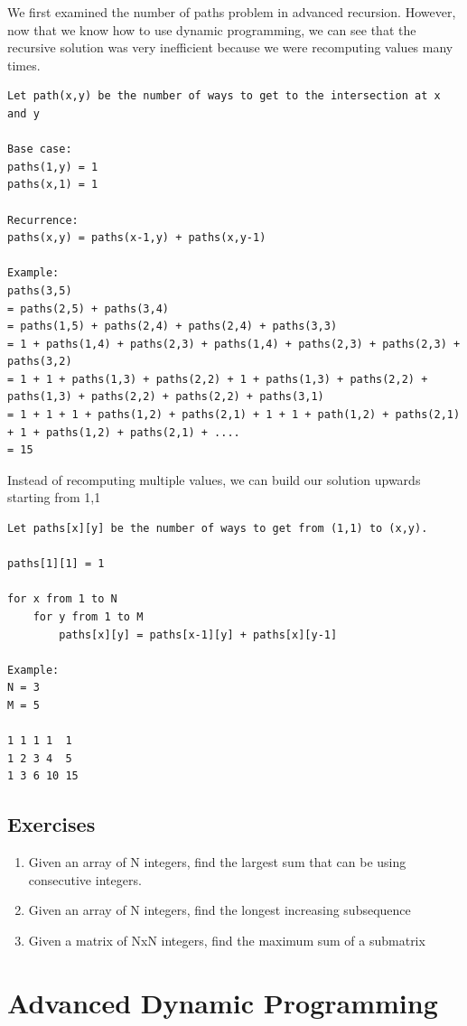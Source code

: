 \documentclass[11pt,oneside]{book}
\begin{document}
We first examined the number of paths problem in advanced recursion. However, now that we know how to use dynamic programming, we can see that the recursive solution was very inefficient because we were recomputing values many times.

\begin{lstlisting}
Let path(x,y) be the number of ways to get to the intersection at x and y

Base case:
paths(1,y) = 1
paths(x,1) = 1

Recurrence:
paths(x,y) = paths(x-1,y) + paths(x,y-1)

Example:
paths(3,5)
= paths(2,5) + paths(3,4)
= paths(1,5) + paths(2,4) + paths(2,4) + paths(3,3)
= 1 + paths(1,4) + paths(2,3) + paths(1,4) + paths(2,3) + paths(2,3) + paths(3,2)
= 1 + 1 + paths(1,3) + paths(2,2) + 1 + paths(1,3) + paths(2,2) + paths(1,3) + paths(2,2) + paths(2,2) + paths(3,1)
= 1 + 1 + 1 + paths(1,2) + paths(2,1) + 1 + 1 + path(1,2) + paths(2,1) + 1 + paths(1,2) + paths(2,1) + ....
= 15
\end{lstlisting}

Instead of recomputing multiple values, we can build our solution upwards starting from 1,1

\begin{lstlisting}
Let paths[x][y] be the number of ways to get from (1,1) to (x,y). 

paths[1][1] = 1

for x from 1 to N
    for y from 1 to M
        paths[x][y] = paths[x-1][y] + paths[x][y-1]

Example:
N = 3
M = 5

1 1 1 1  1
1 2 3 4  5
1 3 6 10 15
\end{lstlisting}

\subsection{Exercises}

\begin{enumerate}
\item Given an array of N integers, find the largest sum that can be using consecutive integers.
\item Given an array of N integers, find the longest increasing subsequence
\item Given a matrix of NxN integers, find the maximum sum of a submatrix
\end{enumerate}

        \section{ Advanced Dynamic Programming }
        
\end{document}
